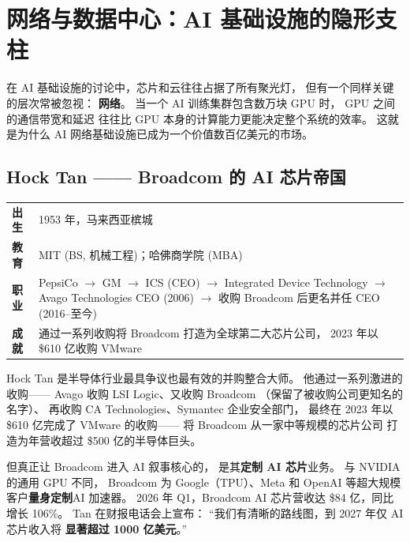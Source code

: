 \section{网络与数据中心：AI 基础设施的隐形支柱}
\label{sec:networking}

在 AI 基础设施的讨论中，芯片和云往往占据了所有聚光灯，
但有一个同样关键的层次常被忽视：
\textbf{网络}。
当一个 AI 训练集群包含数万块 GPU 时，
GPU 之间的通信带宽和延迟
往往比 GPU 本身的计算能力更能决定整个系统的效率。
这就是为什么 AI 网络基础设施已成为一个价值数百亿美元的市场。

\subsection{Hock Tan —— Broadcom 的 AI 芯片帝国}
\label{subsec:hock-tan}

\begin{keybox}
\small
\begin{tabularx}{\textwidth}{lX}
\toprule
\textbf{出生} & 1953 年，马来西亚槟城 \\
\textbf{教育} & MIT (BS, 机械工程)；哈佛商学院 (MBA) \\
\textbf{职业} & PepsiCo $\to$ GM $\to$ ICS (CEO) $\to$
                Integrated Device Technology $\to$
                Avago Technologies CEO (2006) $\to$
                收购 Broadcom 后更名并任 CEO (2016--至今) \\
\textbf{成就} & 通过一系列收购将 Broadcom 打造为全球第二大芯片公司，
                2023 年以 \$610 亿收购 VMware \\
\bottomrule
\end{tabularx}
\end{keybox}

Hock Tan 是半导体行业最具争议也最有效的并购整合大师。
他通过一系列激进的收购——
Avago 收购 LSI Logic、又收购 Broadcom
（保留了被收购公司更知名的名字）、
再收购 CA Technologies、Symantec 企业安全部门，
最终在 2023 年以 \$610 亿完成了 VMware 的收购——
将 Broadcom 从一家中等规模的芯片公司
打造为年营收超过 \$500 亿的半导体巨头。

但真正让 Broadcom 进入 AI 叙事核心的，
是其\textbf{定制 AI 芯片}业务。
与 NVIDIA 的通用 GPU 不同，
Broadcom 为 Google（TPU）、Meta 和 OpenAI
等超大规模客户\textbf{量身定制}AI 加速器。
2026 年 Q1，Broadcom AI 芯片营收达 \$84 亿，同比增长 106\%。
Tan 在财报电话会上宣布：
``我们有清晰的路线图，到 2027 年仅 AI 芯片收入将
\textbf{显著超过 1000 亿美元}。''

